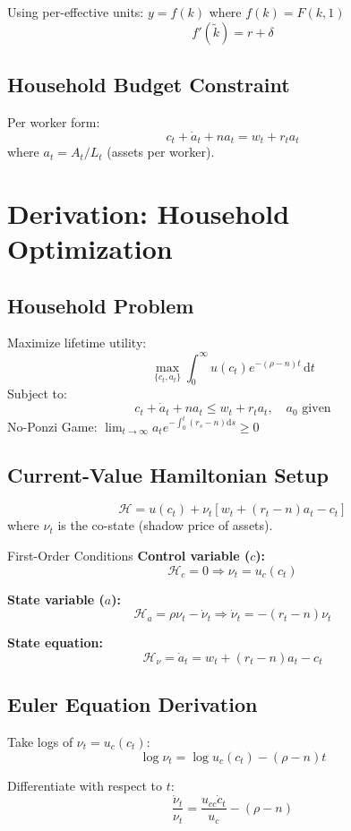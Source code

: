 \documentclass[a4paper,11pt]{article}
\newcommand{\ktilde}{\tilde{k}}
\newcommand{\diff}{\mathrm{d}}
\begin{document}
Using per-effective units: $y = f(k)$ where $f(k) = F(k, 1)$
\[
f'(\ktilde) = r + \delta
\]

\subsection*{Household Budget Constraint}
Per worker form:
\[
c_t + \dot{a}_t + n a_t = w_t + r_t a_t
\]
where $a_t = A_t / L_t$ (assets per worker).

\clearpage

\section*{Derivation: Household Optimization}

\subsection*{Household Problem}
Maximize lifetime utility:
\[
\max_{\{c_t, a_t\}} \int_0^\infty u(c_t) e^{-(\rho-n)t} \, \diff t
\]
Subject to:
\[
c_t + \dot{a}_t + n a_t \le w_t + r_t a_t, \quad a_0 \text{ given}
\]
No-Ponzi Game: $\lim_{t\to\infty} a_t e^{-\int_0^t (r_s-n) \diff s} \ge 0$

\subsection*{Current-Value Hamiltonian Setup}
\[
\mathcal{H} = u(c_t) + \nu_t [w_t + (r_t - n)a_t - c_t]
\]
where $\nu_t$ is the co-state (shadow price of assets).

\begin{derivationbox}{First-Order Conditions}
\textbf{Control variable ($c$):}
\[
\mathcal{H}_c = 0 \Rightarrow \nu_t = u_c(c_t)
\]

\textbf{State variable ($a$):}
\[
\mathcal{H}_a = \rho \nu_t - \dot{\nu}_t \Rightarrow \dot{\nu}_t = -(r_t - n)\nu_t
\]

\textbf{State equation:}
\[
\mathcal{H}_\nu = \dot{a}_t = w_t + (r_t - n)a_t - c_t
\]
\end{derivationbox}

\subsection*{Euler Equation Derivation}
Take logs of $\nu_t = u_c(c_t)$:
\[
\log \nu_t = \log u_c(c_t) - (\rho - n)t
\]

Differentiate with respect to $t$:
\[
\frac{\dot{\nu}_t}{\nu_t} = \frac{u_{cc} \dot{c}_t}{u_c} - (\rho - n)
\]
\end{document}
